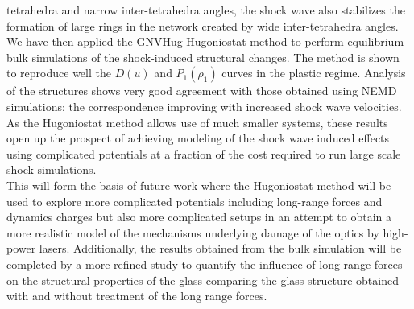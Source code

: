 \documentclass[aps,10pt,twocolumn]{revtex4}
\begin{document}
tetrahedra and narrow inter-tetrahedra angles, the shock wave also stabilizes the formation of
large rings in the network created by wide inter-tetrahedra angles.\\ 
We have then applied the GNVHug Hugoniostat method to perform equilibrium bulk
simulations of the shock-induced structural changes. The method is shown to reproduce well the
$D(u)$ and $P_1(\rho_1)$ curves in the plastic regime. Analysis of the structures shows very good
agreement with those obtained using NEMD simulations; the correspondence improving with
increased shock wave velocities. As the Hugoniostat method allows use of much smaller systems,
these results open up the prospect of achieving modeling of the shock wave induced effects using
complicated potentials at a fraction of the cost required to run large scale shock simulations.\\
This will form the basis of future work where the Hugoniostat method will be used to explore
more complicated potentials including long-range forces and dynamics charges but also more
complicated setups in an attempt to obtain a more realistic model of the mechanisms underlying
damage of the optics by high-power lasers. Additionally, the results obtained from the bulk
simulation will be completed by a more refined study to quantify the influence of long range
forces on the structural properties of the glass comparing the glass structure obtained with and without
treatment of the long range forces.
\end{document}
